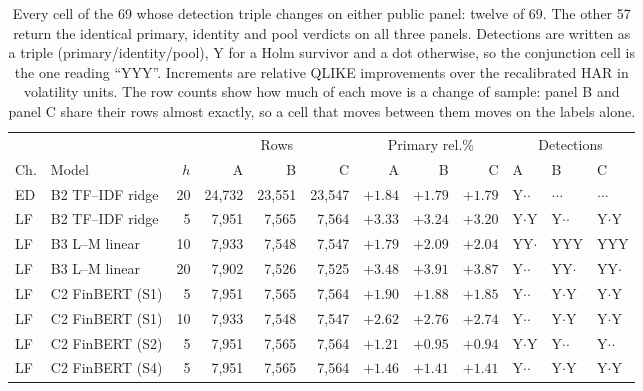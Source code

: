 \begin{table}[htbp]
\centering
\caption[Cells whose ladder verdict moves under the public rebuild]{Every
cell of the 69 whose detection triple changes on either public panel:
twelve of 69. The other 57 return the identical primary, identity and pool
verdicts on all three panels. Detections are written as a triple
(primary/identity/pool), Y for a Holm survivor and a dot otherwise, so the
conjunction cell is the one reading ``YYY''. Increments are relative QLIKE
improvements over the recalibrated HAR in volatility units. The row counts
show how much of each move is a change of sample: panel B and panel C share
their rows almost exactly, so a cell that moves between them moves on the
labels alone.}
\label{tab:app-public-cells}
\singlespacing\footnotesize
\setlength{\tabcolsep}{1.5pt}
\begin{tabular}{@{}llrrrrrrrlll@{}}
\toprule
& & & \multicolumn{3}{c}{Rows} & \multicolumn{3}{c}{Primary rel.\%} & \multicolumn{3}{c}{Detections} \\
\cmidrule(lr){4-6}\cmidrule(lr){7-9}\cmidrule(lr){10-12}
Ch. & Model & $h$ & A & B & C & A & B & C & A & B & C \\
\midrule
ED & B2 TF--IDF ridge & 20 & 24{,}732 & 23{,}551 & 23{,}547 & $+1.84$ & $+1.79$ & $+1.79$ & Y$\cdot$$\cdot$ & $\cdot$$\cdot$$\cdot$ & $\cdot$$\cdot$$\cdot$ \\
\addlinespace
LF & B2 TF--IDF ridge & 5 & 7{,}951 & 7{,}565 & 7{,}564 & $+3.33$ & $+3.24$ & $+3.20$ & Y$\cdot$Y & Y$\cdot$$\cdot$ & Y$\cdot$Y \\
LF & B3 L--M linear & 10 & 7{,}933 & 7{,}548 & 7{,}547 & $+1.79$ & $+2.09$ & $+2.04$ & YY$\cdot$ & YYY & YYY \\
LF & B3 L--M linear & 20 & 7{,}902 & 7{,}526 & 7{,}525 & $+3.48$ & $+3.91$ & $+3.87$ & Y$\cdot$$\cdot$ & YY$\cdot$ & YY$\cdot$ \\
LF & C2 FinBERT (S1) & 5 & 7{,}951 & 7{,}565 & 7{,}564 & $+1.90$ & $+1.88$ & $+1.85$ & Y$\cdot$$\cdot$ & Y$\cdot$Y & Y$\cdot$Y \\
LF & C2 FinBERT (S1) & 10 & 7{,}933 & 7{,}548 & 7{,}547 & $+2.62$ & $+2.76$ & $+2.74$ & Y$\cdot$$\cdot$ & Y$\cdot$Y & Y$\cdot$Y \\
LF & C2 FinBERT (S2) & 5 & 7{,}951 & 7{,}565 & 7{,}564 & $+1.21$ & $+0.95$ & $+0.94$ & Y$\cdot$Y & Y$\cdot$$\cdot$ & Y$\cdot$$\cdot$ \\
LF & C2 FinBERT (S4) & 5 & 7{,}951 & 7{,}565 & 7{,}564 & $+1.46$ & $+1.41$ & $+1.41$ & Y$\cdot$$\cdot$ & Y$\cdot$Y & Y$\cdot$Y \\

\end{tabular}
\end{table}
